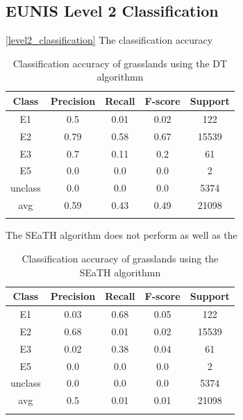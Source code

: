 \documentclass[authoryear, review,12pt,number]{elsarticle}
\begin{document}
{\subsection{EUNIS Level 2 Classification}
\ref{level2_classification}
The classification accuracy
\begin{table}
\begin{tabular}{c c c c c}
Class & Precision & Recall & F-score & Support\\
\hline
E1 & 0.5 & 0.01 & 0.02 & 122\\
E2 & 0.79 & 0.58 & 0.67 & 15539\\
E3 & 0.7 & 0.11 & 0.2 & 61\\
E5 & 0.0 & 0.0 & 0.0 & 2\\
unclass & 0.0 & 0.0 & 0.0 & 5374\\
avg & 0.59 & 0.43 & 0.49 & 21098\\
\label{fig_dt_lvl2_classification}
\end{tabular}
\caption{Classification accuracy of grasslands using the DT algorithmn}
\end{table}

The SEaTH algorithm does not perform as well as the 
\begin{table}
\begin{tabular}{c c c c c}
Class & Precision & Recall & F-score & Support\\
\hline
E1 & 0.03 & 0.68 & 0.05 & 122\\
E2 & 0.68 & 0.01 & 0.02 & 15539\\
E3 & 0.02 & 0.38 & 0.04 & 61\\
E5 & 0.0 & 0.0 & 0.0 & 2\\
unclass & 0.0 & 0.0 & 0.0 & 5374\\
avg & 0.5 & 0.01 & 0.01 & 21098\\
\label{fig_seath_lvl2_classification}
\end{tabular}
\caption{Classification accuracy of grasslands using the SEaTH algorithmn}
\end{table}

}
\end{document}

